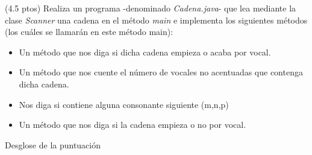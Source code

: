 \documentclass[addpoints,12pt]{exam}
\begin{document}
\begin{questions}
\begin{parts}
\end{parts}
\newpage
\question (4.5 ptos) Realiza un programa -denominado \emph{Cadena.java}- que lea mediante la clase \emph{Scanner} una cadena en el método \emph{main} e implementa los siguientes métodos (los cuáles se llamarán en este método main):
\begin{itemize}
\item Un método que nos diga si dicha cadena empieza o acaba por vocal.
\item Un método que nos cuente el número de vocales no acentuadas que contenga dicha cadena.
\item Nos diga si contiene alguna consonante siguiente (m,n,p)
\item Un método que nos diga si la cadena empieza o no por vocal.
\end{itemize}
Desglose de la puntuación
\end{questions}
\end{document}
